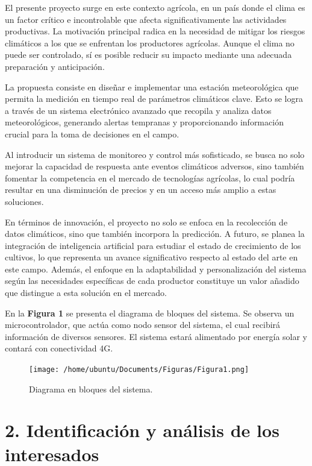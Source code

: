 \documentclass[
11pt, %
codirector, %
]{charter}
\begin{document}
El presente proyecto surge en este contexto agrícola, en un país donde el clima es un factor crítico e incontrolable que afecta significativamente las actividades productivas. La motivación principal radica en la necesidad de mitigar los riesgos climáticos a los que se enfrentan los productores agrícolas. Aunque el clima no puede ser controlado, sí es posible reducir su impacto mediante una adecuada preparación y anticipación.

La propuesta consiste en diseñar e implementar una estación meteorológica que permita la medición en tiempo real de parámetros climáticos clave. Esto se logra a través de un sistema electrónico avanzado que recopila y analiza datos meteorológicos, generando alertas tempranas y proporcionando información crucial para la toma de decisiones en el campo.

Al introducir un sistema de monitoreo y control más sofisticado, se busca no solo mejorar la capacidad de respuesta ante eventos climáticos adversos, sino también fomentar la competencia en el mercado de tecnologías agrícolas, lo cual podría resultar en una disminución de precios y en un acceso más amplio a estas soluciones.

En términos de innovación, el proyecto no solo se enfoca en la recolección de datos climáticos, sino que también incorpora la predicción. A futuro, se planea la integración de inteligencia artificial para estudiar el estado de crecimiento de los cultivos, lo que representa un avance significativo respecto al estado del arte en este campo. Además, el enfoque en la adaptabilidad y personalización del sistema según las necesidades específicas de cada productor constituye un valor añadido que distingue a esta solución en el mercado.

En la \textbf{Figura 1} se presenta el diagrama de bloques del sistema. Se observa un microcontrolador, que actúa como nodo sensor del sistema, el cual recibirá información de diversos sensores. El sistema estará alimentado por energía solar y contará con conectividad 4G.

\begin{figure}[htpb]
\centering 
\texttt{[image: /home/ubuntu/Documents/Figuras/Figura1.png]}
\caption{Diagrama en bloques del sistema.}
\label{fig:diagBloques}
\end{figure}

\vspace{25px}

\newpage

\section{2. Identificación y análisis de los interesados}
\label{sec:interesados}
\end{document}
